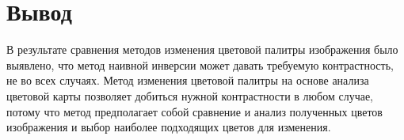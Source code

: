 \section*{Вывод}

В результате сравнения методов изменения цветовой палитры изображения было выявлено, что метод наивной инверсии может давать требуемую контрастность, не во всех случаях. Метод изменения цветовой палитры на основе анализа цветовой карты позволяет добиться нужной контрастности в любом случае, потому что метод предполагает собой сравнение и анализ полученных цветов изображения и выбор наиболее подходящих цветов для изменения.
